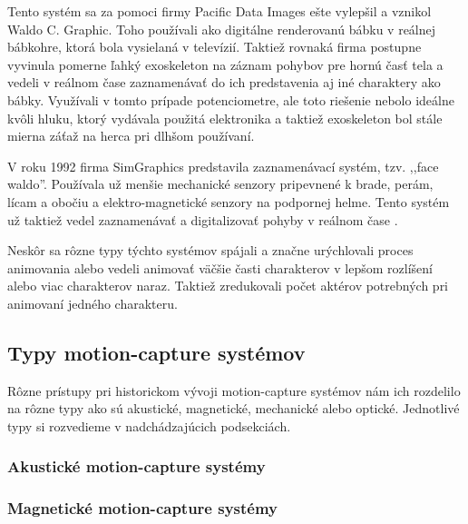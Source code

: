 Tento systém sa za pomoci firmy Pacific Data Images ešte vylepšil a vznikol Waldo C. Graphic. Toho používali ako digitálne renderovanú bábku v reálnej bábkohre, ktorá bola vysielaná v televízií. Taktiež rovnaká firma postupne vyvinula pomerne ľahký exoskeleton na záznam pohybov pre hornú časť tela a vedeli v reálnom čase zaznamenávať do ich predstavenia aj iné charaktery ako bábky. Využívali v tomto prípade potenciometre, ale toto riešenie nebolo ideálne kvôli hluku, ktorý vydávala použitá elektronika a taktiež exoskeleton bol stále mierna záťaž na herca pri dlhšom používaní.

V roku 1992 firma SimGraphics predstavila zaznamenávací systém, tzv. ,,face waldo''. Používala už menšie mechanické senzory pripevnené k brade, perám, lícam a obočiu a elektro-magnetické senzory na podpornej helme. Tento systém už taktiež vedel zaznamenávať a digitalizovať pohyby v reálnom čase \cite{mocapHistory}.

Neskôr sa rôzne typy týchto systémov spájali a značne urýchlovali proces animovania alebo vedeli animovať väčšie časti charakterov v lepšom rozlíšení alebo viac charakterov naraz. Taktiež zredukovali počet aktérov potrebných pri animovaní jedného charakteru.


\subsection{Typy motion-capture systémov}

Rôzne prístupy pri historickom vývoji motion-capture systémov nám ich rozdelilo na rôzne typy ako sú akustické, magnetické, mechanické alebo optické. Jednotlivé typy si rozvedieme v nadchádzajúcich podsekciách.

\subsubsection{Akustické motion-capture systémy}

\subsubsection{Magnetické motion-capture systémy}

